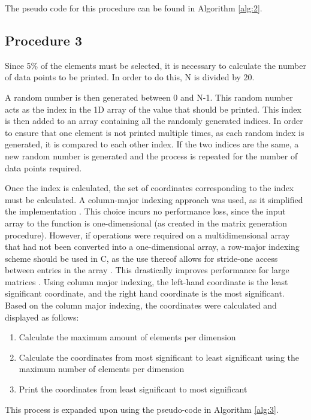 \documentclass[10pt,twocolumn]{witseiepaper}
\begin{document}
The pseudo code for this procedure can be found in Algorithm \ref{alg:2}.

\subsection{Procedure 3}
Since 5\% of the elements must be selected, it is necessary to calculate the number of data points to be printed. In order to do this, N is divided by 20.

A random number is then generated between 0 and N-1. This random number acts as the index in the 1D array of the value that should be printed. This index is then added to an array containing all the randomly generated indices. In order to ensure that one element is not printed multiple times, as each random index is generated, it is compared to each other index. If the two indices are the same, a new random number is generated and the process is repeated for the number of data points required.

Once the index is calculated, the set of coordinates corresponding to the index must be calculated. A column-major indexing approach was used, as it simplified the implementation \cite{HPC}. This choice incurs no performance loss, since the input array to the function is one-dimensional (as created in the matrix generation procedure). However, if operations were required on a multidimensional array that had not been converted into a one-dimensional array, a row-major indexing scheme should be used in C, as the use thereof allows for stride-one access between entries in the array \cite{HPC}. This drastically improves performance for large matrices \cite{HPC}. Using column major indexing, the left-hand coordinate is the least significant coordinate, and the right hand coordinate is the most significant. Based on the column major indexing, the coordinates were calculated and displayed as follows:

\begin{enumerate}
	\item Calculate the maximum amount of elements per dimension
	\item Calculate the coordinates from most significant to least significant using the maximum number of elements per dimension
	\item Print the coordinates from least significant to most significant
\end{enumerate}

This process is expanded upon using the pseudo-code in Algorithm \ref{alg:3}.
\end{document}
